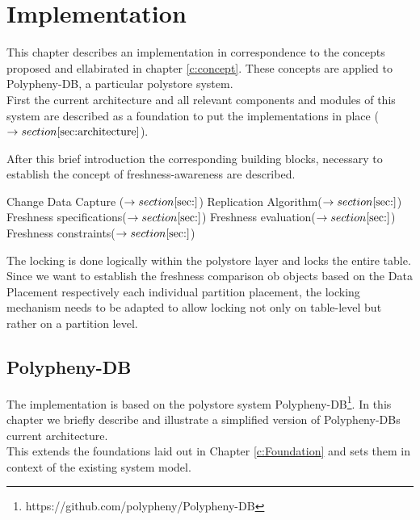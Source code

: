 \chapter{Implementation}
\label{c:implementation}

This chapter describes an implementation in correspondence to the concepts proposed and ellabirated in chapter \ref{c:concept}. 
These concepts are applied to Polypheny-DB, a particular polystore system.\\
First the current architecture and all relevant components and modules of this system are described as a foundation to put the implementations in place ($\rightarrow section \ref{sec:architecture}$).

After this brief introduction the corresponding building blocks, necessary to establish the concept of freshness-awareness are described.

Change Data Capture ($\rightarrow section \ref{sec:}$)
Replication Algorithm($\rightarrow section \ref{sec:}$)
Freshness specifications($\rightarrow section \ref{sec:}$)
Freshness evaluation($\rightarrow section \ref{sec:}$)
Freshness constraints($\rightarrow section \ref{sec:}$)







The locking is done logically within the polystore layer and locks the entire table.
Since we want to establish the freshness comparison ob objects based on the Data Placement respectively each individual partition placement, the locking mechanism
needs to be adapted to allow locking not only on table-level but rather on a partition level. 





\section{Polypheny-DB}
\label{sec:architecture}


The implementation is based on the polystore system Polypheny-DB\footnote{https://github.com/polypheny/Polypheny-DB}.
In this chapter we briefly describe and illustrate a simplified version of Polypheny-DBs current architecture.\\
This extends the foundations laid out in Chapter \ref{c:Foundation} and sets them in context of the existing system model.


